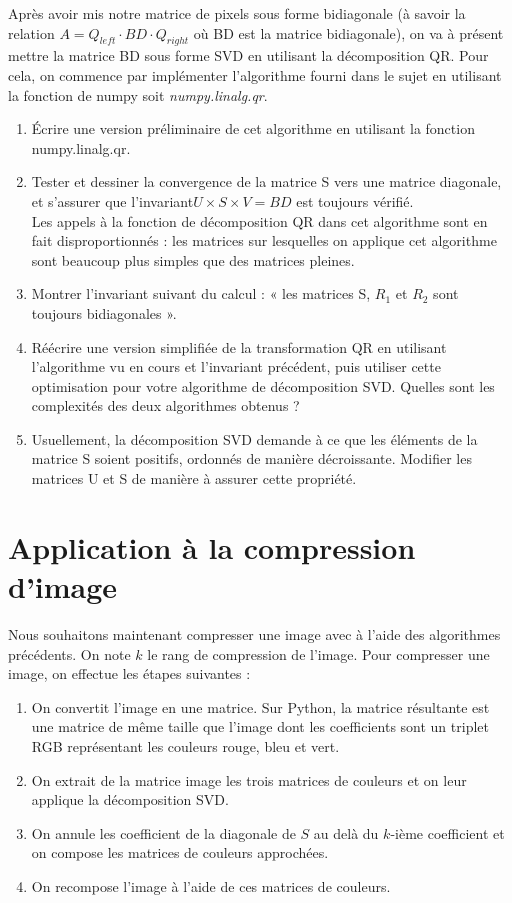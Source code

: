 \documentclass{article}
\begin{document}
Après avoir mis notre matrice de pixels sous forme bidiagonale (à savoir la relation $A = Q_{left} \cdot BD \cdot Q_{right}$ où BD est la matrice bidiagonale), on va à présent mettre la matrice BD sous forme SVD en utilisant la décomposition QR. Pour cela, on commence par implémenter l'algorithme fourni dans le sujet en utilisant la fonction de numpy soit \textit{numpy.linalg.qr}.
\begin{enumerate}
    \item Écrire une version préliminaire de cet algorithme en utilisant la fonction numpy.linalg.qr.
    \item Tester et dessiner la convergence de la matrice S vers une matrice diagonale, et s’assurer que l’invariant$ U\times S\times V = BD$ est toujours vérifié.\\
    \newline
Les appels à la fonction de décomposition QR dans cet algorithme sont en fait disproportionnés : les matrices sur lesquelles on applique cet algorithme sont beaucoup plus simples que des matrices pleines.
    \item Montrer l’invariant suivant du calcul : « les matrices S, $R_1$ et $R_2$ sont toujours bidiagonales ».
    \item Réécrire une version simplifiée de la transformation QR en utilisant l’algorithme vu en cours et l’invariant précédent, puis utiliser cette optimisation pour votre algorithme de décomposition SVD. Quelles sont les complexités des deux algorithmes obtenus ?
    \item Usuellement, la décomposition SVD demande à ce que les éléments de la matrice S soient positifs, ordonnés de manière décroissante. Modifier les matrices U et S de manière à assurer cette propriété.
\end{enumerate}






\section{Application à la compression d’image}

Nous souhaitons maintenant compresser une image avec à l'aide des algorithmes précédents.
On note $k$ le rang de compression de l'image.
Pour compresser une image, on effectue les étapes suivantes : \\
\begin{enumerate}
    \item On convertit l'image en une matrice. Sur Python, la matrice résultante est une matrice de même taille que l'image dont les coefficients sont un triplet RGB représentant les couleurs rouge, bleu et vert. 
    \item On extrait de la matrice image les trois matrices de couleurs et on leur applique la décomposition SVD. 
    \item On annule les coefficient de la diagonale de $S$ au delà du $k$-ième coefficient et on compose les matrices de couleurs approchées.
    \item On recompose l'image à l'aide de ces matrices de couleurs.\\
\end{enumerate}
\end{document}
